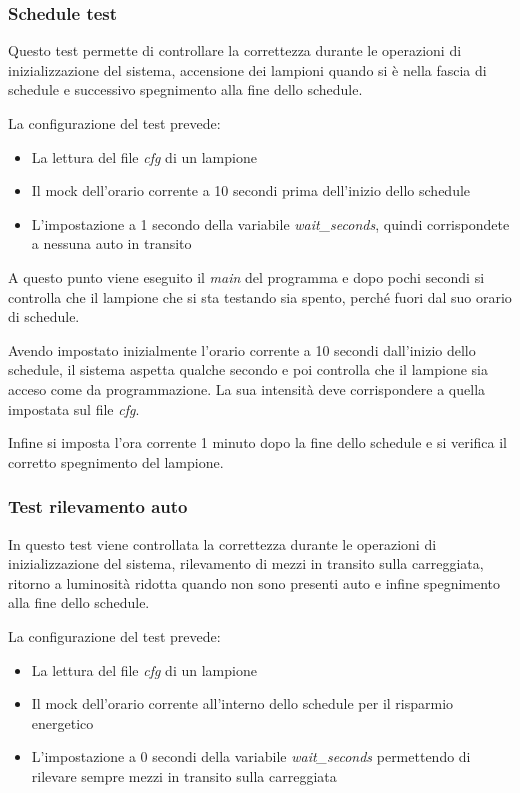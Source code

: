 \subsubsection{Schedule test \label{st}}

Questo test permette di controllare la correttezza durante le operazioni di inizializzazione del sistema, accensione dei lampioni quando si è nella fascia di schedule e successivo spegnimento alla fine dello schedule.

La configurazione del test prevede:
\begin{itemize}
	\item La lettura del file \textit{cfg} di un lampione
	\item Il mock dell'orario corrente a 10 secondi prima dell'inizio dello schedule
	\item L'impostazione a 1 secondo della variabile \textit{wait\_seconds}, quindi corrispondete a nessuna auto in transito
\end{itemize}

A questo punto viene eseguito il \textit{main} del programma e dopo pochi secondi si controlla che il lampione che si sta testando sia spento, perché fuori dal suo orario di schedule.

Avendo impostato inizialmente l'orario corrente a 10 secondi dall'inizio dello schedule, il sistema aspetta qualche secondo e poi controlla che il lampione sia acceso come da programmazione.
La sua intensità deve corrispondere a quella impostata sul file \textit{cfg}.

Infine si imposta l'ora corrente 1 minuto dopo la fine dello schedule e si verifica il corretto spegnimento del lampione.

\subsubsection{Test rilevamento auto}

In questo test viene controllata la correttezza durante le operazioni di inizializzazione del sistema, rilevamento di mezzi in transito sulla carreggiata, ritorno a luminosità ridotta quando non sono presenti auto e infine spegnimento alla fine dello schedule.

La configurazione del test prevede:
\begin{itemize}
	\item La lettura del file \textit{cfg} di un lampione
	\item Il mock dell'orario corrente all'interno dello schedule per il risparmio energetico
	\item L'impostazione a 0 secondi della variabile \textit{wait\_seconds} permettendo di rilevare sempre mezzi in transito sulla carreggiata
\end{itemize}

